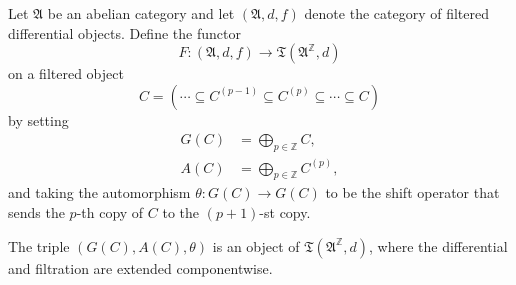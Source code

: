 Let $\mathfrak{A}$ be an abelian category and let $(\mathfrak{A}, d, f)$ denote the category of filtered differential objects. Define the functor
$$F : (\mathfrak{A}, d, f) \to \mathfrak{T}(\mathfrak{A}^{\mathbb{Z}}, d)$$
on a filtered object
$$C = \left( \cdots \subseteq C^{(p-1)} \subseteq C^{(p)} \subseteq \cdots \subseteq C \right)$$
by setting
\begin{align*}
G(C) &= \bigoplus_{p \in \mathbb{Z}} C, \\
A(C) &= \bigoplus_{p \in \mathbb{Z}} C^{(p)},
\end{align*}
and taking the automorphism $\theta : G(C) \to G(C)$ to be the shift operator that sends the $p$-th copy of $C$ to the $(p+1)$-st copy.

The triple $(G(C), A(C), \theta)$ is an object of $\mathfrak{T}(\mathfrak{A}^{\mathbb{Z}}, d)$, where the differential and filtration are extended componentwise.
